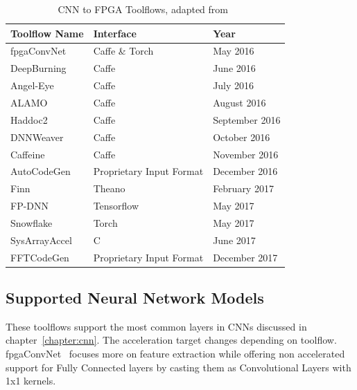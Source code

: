 \begin{table}[!htpb]
    \centering
    \begin{tabular}{lll}
    \hline
    \textbf{Toolflow Name} & \textbf{Interface}       & \textbf{Year}  \\ \hline
    fpgaConvNet            & Caffe \& Torch           & May 2016       \\
    DeepBurning            & Caffe                    & June 2016      \\
    Angel-Eye              & Caffe                    & July 2016      \\
    ALAMO                  & Caffe                    & August 2016    \\
    Haddoc2                & Caffe                    & September 2016 \\
    DNNWeaver              & Caffe                    & October 2016   \\
    Caffeine               & Caffe                    & November 2016  \\
    AutoCodeGen            & Proprietary Input Format & December 2016  \\
    Finn                   & Theano                   & February 2017  \\
    FP-DNN                 & Tensorflow               & May 2017       \\
    Snowflake              & Torch                    & May 2017       \\
    SysArrayAccel          & C                        & June 2017      \\
    FFTCodeGen             & Proprietary Input Format & December 2017  \\ \hline
    \end{tabular}
    \label{table:toolflow}
    \caption{CNN to FPGA Toolflows, adapted from~\cite{misc:cnntofpga}}
\end{table}
\subsection{Supported Neural Network Models}

\quad These toolflows support the most common layers in CNNs discussed in chapter~\ref{chapter:cnn}. The acceleration target changes
depending on toolflow. fpgaConvNet~\cite{fpgaconvnet} focuses more on feature extraction while offering non accelerated support for Fully Connected layers
by casting them as Convolutional Layers with 1x1 kernels.

